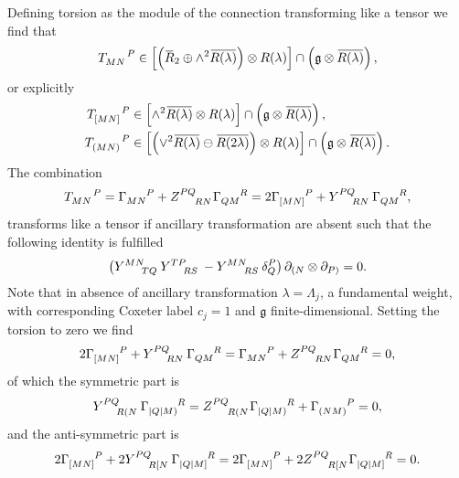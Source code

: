 \documentclass{article}
\begin{document}
Defining torsion as the module of the connection transforming like a tensor we find that 
\begin{equation}
    \tensor{T}{_M_N^P}\in \left[\left(\overbar{R}_2\oplus \wedge^2\overbar{R(\lambda)}\right)\otimes R(\lambda)\right]\cap \left(\mathfrak{g}\otimes\overbar{R(\lambda)}\right),
\end{equation}
or explicitly 
\begin{align}
    \tensor{T}{_{[MN]}^P} &\in \left[\wedge^2\overbar{R(\lambda)}\otimes R(\lambda)\right]\cap \left(\mathfrak{g}\otimes\overbar{R(\lambda)}\right),\\
    \tensor{T}{_{(MN)}^P} &\in \left[\left(\vee^2\overbar{R(\lambda)}\ominus \overbar{R(2\lambda)}\right)\otimes R(\lambda)\right]\cap \left(\mathfrak{g}\otimes\overbar{R(\lambda)}\right).
\end{align}
The combination 
\begin{equation}
    \tensor{T}{_M_N^P} = \tensor{\Gamma}{_M_N^P}+\tensor{Z}{^P^Q_R_N}\tensor{\Gamma}{_Q_M^R} = 2\tensor{\Gamma}{_{[MN]}^P}+\tensor{Y}{^P^Q_R_N}\tensor{\Gamma}{_Q_M^R},
\end{equation}
transforms like a tensor if ancillary transformation are absent such that the following identity is fulfilled 
\begin{equation}
    \left(\tensor{Y}{^M^N_T_Q}\tensor{Y}{^T^P_R_S}-\tensor{Y}{^M^N_R_S}\delta^P_Q\right)\pd_{(N}\otimes\pd_{P)} = 0.
\end{equation}
Note that in absence of ancillary transformation $\lambda=\Lambda_j$, a fundamental weight, with corresponding Coxeter label $c_j=1$ and $\mathfrak{g}$ finite-dimensional.
Setting the torsion to zero we find 
\begin{equation}
    2\tensor{\Gamma}{_{[MN]}^P}+\tensor{Y}{^P^Q_R_N}\tensor{\Gamma}{_Q_M^R} = \tensor{\Gamma}{_{MN}^P}+\tensor{Z}{^P^Q_R_N}\tensor{\Gamma}{_Q_M^R}= 0,
\end{equation}
of which the symmetric part is 
\begin{equation}
    \tensor{Y}{^P^Q_R_{(N}}\tensor{\Gamma}{_{|Q|M)}^R} = \tensor{Z}{^P^Q_R_{(N}}\tensor{\Gamma}{_{|Q|M)}^R}+\tensor{\Gamma}{_{(NM)}^P} = 0,
\end{equation}
and the anti-symmetric part is 
\begin{equation}
    2\tensor{\Gamma}{_{[MN]}^P}+2\tensor{Y}{^P^Q_R_{[N}}\tensor{\Gamma}{_{|Q|M]}^R} = 2\tensor{\Gamma}{_{[MN]}^P}+2\tensor{Z}{^P^Q_R_{[N}}\tensor{\Gamma}{_{|Q|M]}^R} =0.
\end{equation}
\end{document}

